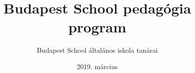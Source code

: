 \documentclass[magyar,12pt,a4paper,oneside,draft]{report}
\begin{document}
\title{Budapest School pedagógia program}
\author{Budapest School általános iskola tanárai}
\date{2019. m\'arcius}
\maketitle

\tableofcontents
\newpage



{}
\label{sec:bibliographyk}

\end{document}
